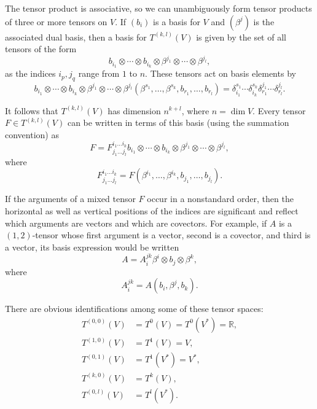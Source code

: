 The tensor product is associative, so we can unambiguously form tensor products of three or more tensors on $V$. If $(b_i)$ is a basis for $V$ and $(\beta^j)$ is the associated dual basis, then a basis for $T^{(k,l)}(V)$ is given by the set of all tensors of the form
\begin{equation}
b_{i_1} \otimes \cdots \otimes b_{i_k} \otimes \beta^{j_1} \otimes \cdots \otimes \beta^{j_l}, \tag{B.4}
\end{equation}
as the indices $i_p, j_q$ range from $1$ to $n$. These tensors act on basis elements by
\[
b_{i_1} \otimes \cdots \otimes b_{i_k} \otimes \beta^{j_1} \otimes \cdots \otimes \beta^{j_l}(\beta^{s_1}, \ldots, \beta^{s_k}, b_{r_1}, \ldots, b_{r_l}) = \delta_{i_1}^{s_1} \cdots \delta_{i_k}^{s_k} \delta_{r_1}^{j_1} \cdots \delta_{r_l}^{j_l}.
\]

It follows that $T^{(k,l)}(V)$ has dimension $n^{k+l}$, where $n = \dim V$. Every tensor $F \in T^{(k,l)}(V)$ can be written in terms of this basis (using the summation convention) as
\begin{equation}
F = F_{j_1 \ldots j_l}^{i_1 \ldots i_k} b_{i_1} \otimes \cdots \otimes b_{i_k} \otimes \beta^{j_1} \otimes \cdots \otimes \beta^{j_l},
\tag{B.5}
\end{equation}
where
\[
F_{j_1 \ldots j_l}^{i_1 \ldots i_k} = F(\beta^{i_1}, \ldots, \beta^{i_k}, b_{j_1}, \ldots, b_{j_l}).
\]

If the arguments of a mixed tensor $F$ occur in a nonstandard order, then the horizontal as well as vertical positions of the indices are significant and reflect which arguments are vectors and which are covectors. For example, if $A$ is a $(1,2)$-tensor whose first argument is a vector, second is a covector, and third is a vector, its basis expression would be written
\[
A = A_i^{jk} \beta^i \otimes b_j \otimes \beta^k,
\]
where
\begin{equation}
A_i^{jk} = A(b_i, \beta^j, b_k).
\tag{B.6}
\end{equation}

There are obvious identifications among some of these tensor spaces:
\begin{align}
T^{(0,0)}(V) &= T^0(V) = T^0(V^*) = \mathbb{R},\\
T^{(1,0)}(V) &= T^1(V) = V,\\
T^{(0,1)}(V) &= T^1(V^*) = V^*,\\
T^{(k,0)}(V) &= T^k(V),\\
T^{(0,l)}(V) &= T^l(V^*).
\tag{B.7}
\end{align}

